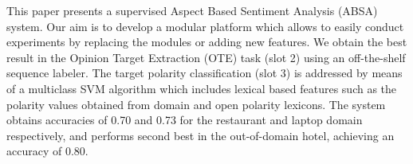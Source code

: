 This paper presents a supervised Aspect Based Sentiment Analysis (ABSA) system. Our aim is to develop a modular platform which allows to easily conduct experiments by replacing the modules or adding new features. We obtain the best result in the Opinion Target Extraction (OTE) task (slot 2) using an off-the-shelf sequence labeler. The target polarity classification (slot 3) is addressed by means of a multiclass SVM algorithm which includes lexical based features such as the polarity values obtained from domain and open polarity lexicons. The system obtains accuracies of 0.70 and 0.73 for the restaurant and laptop domain respectively, and performs second best in the out-of-domain hotel, achieving an accuracy of 0.80.
